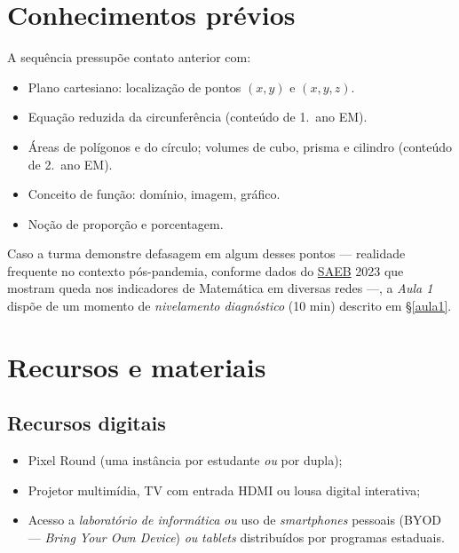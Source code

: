 \documentclass[12pt,a4paper]{scrartcl}
\begin{document}
\section{Conhecimentos prévios}\label{sec:prerrequisitos}

A sequência pressupõe contato anterior com:

\begin{itemize}[leftmargin=1.3em,itemsep=0.15em,topsep=0.3em]
  \item Plano cartesiano: localização de pontos $(x, y)$ e $(x, y, z)$.
  \item Equação reduzida da circunferência (conteúdo de 1.\textordmasculine\ ano EM).
  \item Áreas de polígonos e do círculo; volumes de cubo, prisma e cilindro (conteúdo de 2.\textordmasculine\ ano EM).
  \item Conceito de função: domínio, imagem, gráfico.
  \item Noção de proporção e porcentagem.
\end{itemize}

Caso a turma demonstre defasagem em algum desses pontos --- realidade frequente no contexto pós-pandemia, conforme dados do \href{https://www.gov.br/inep/pt-br/areas-de-atuacao/avaliacao-e-exames-educacionais/saeb}{SAEB} 2023 que mostram queda nos indicadores de Matemática em diversas redes ---, a \emph{Aula 1} dispõe de um momento de \emph{nivelamento diagnóstico} (10 min) descrito em §\ref{aula1}.

\section{Recursos e materiais}\label{sec:recursos}

\subsection{Recursos digitais}
\begin{itemize}[leftmargin=1.3em,itemsep=0.15em,topsep=0.3em]
  \item Pixel Round (uma instância por estudante \emph{ou} por dupla);
  \item Projetor multimídia, TV com entrada HDMI ou lousa digital interativa;
  \item Acesso a \emph{laboratório de informática} \emph{ou} uso de \emph{smartphones} pessoais (BYOD --- \emph{Bring Your Own Device}) \emph{ou} \emph{tablets} distribuídos por programas estaduais.
\end{itemize}
\end{document}
